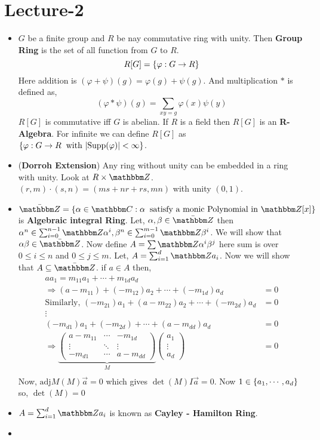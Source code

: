 \documentclass[lec]{subfiles}
\begin{document}
\section{Lecture-2}

\begin{itemize}
    \item $G$ be a finite group and $R$ be nay commutative ring with unity. Then \textbf{Group Ring} is the set of all function from $G$ to $R$.\[ R[G] = \qty{\varphi: G \to R}\] Here addition is $ (\varphi + \psi)(g) = \varphi(g) + \psi(g)$. And multiplication $*$ is defined as, \[(\varphi * \psi)(g) = \sum_{xy = g } \varphi(x) \psi(y)\] $R[G]$ is commutative iff $G$ is abelian. If $R$ is a field then $R[G]$ is an \textbf{R-Algebra}. For infinite we can define $R[G]$ as $\qty{\varphi : G \to R \hspace{0.2cm} \text{with } |\text{Supp}(\varphi)| < \infty }$. 
    \item (\textbf{Dorroh Extension}) Any ring without unity can be embedded in a ring with unity. Look at $R \times \Z$. $(r,m) \cdot (s,n) = (ms+nr+rs , mn)$ with unity $(0,1)$.
    \item $\bar{\Z} = \qty{\alpha \in \C : \alpha \hspace{0.2cm} \text{satisfy a monic Polynomial in } \Z [x]}$ is \textbf{Algebraic integral Ring}. Let, $\alpha , \beta \in \bar{\Z}$ then $\alpha^n \in \sum_{i=0}^{n-1} \Z \alpha^i, \beta^n \in \sum_{i=0}^{m-1} \Z \beta^{i}$. We will show that $\alpha\beta \in \bar{\Z}$. Now define $A = \sum \Z \alpha^i \beta ^j$ here sum is over $0\le i \le n$ and $0 \le j \le m$. Let, $A = \sum_{i=1}^d \Z a_i$. Now we will show that $ A \subseteq \bar{\Z}$. if $a \in A$ then, \begin{align*}
        aa_1 = m_{11}a_1 + \cdots + m_{1d}a_d \\
      \Rightarrow  (a-m_{11}) + (-m_{12})a_2 + \cdots + (-m_{1d}) a_d &= 0 \\
      \text{Similarly, }(-m_{21})a_1 + (a-m_{22})a_2 +\cdots + (-m_{2d})a_d &= 0 \\
      \vdots  \\
      (-m_{d1})a_1 +(-m_{2d}) + \cdots +(a-m_{dd})a_d &=0 \\
      \Rightarrow \underbrace{\begin{pmatrix}
        a-m_{11}  & \cdots & -m_{1d} \\
        \vdots & \ddots & \vdots \\
        -m_{d1} & \cdots & a - m_{dd}   
      \end{pmatrix}}_{M} \begin{pmatrix}
        a_1 \\ \vdots \\ a_d 
      \end{pmatrix} &= 0 \\
    \end{align*}
 Now, $\text{adj}M (M) \vec{a} = 0$ which gives $\det(M)I \vec{a} = 0$. Now $1 \in \qty{a_1, \cdots, a_d}$ so, $\det(M) = 0$
 \item $A =\sum_{i=1}^d \Z a_i$ is known as \textbf{Cayley - Hamilton Ring}.
 \item 
\end{itemize}
\end{document}
